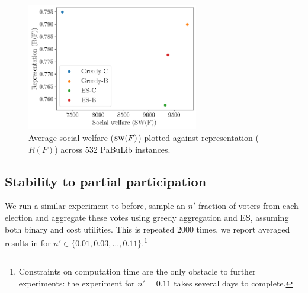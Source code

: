 \documentclass[mnsc,blindrev]{informs3_freeuse} %
\newcommand{\kibitz}[2]{\ifnum\Comments=1{\color{#1}{#2}}\fi}
\newcommand{\rf}[1]{\kibitz{blue}{[Roy says:#1]}}
\newcommand{\gb}[1]{\kibitz{red}{[GB:#1]}}
\newcommand{\sw}{\textsc{sw}}
\newcommand{\mes}{ES}
\newcommand{\pabu}{PaBuLib}
\begin{document}
\begin{figure}[!h]
\begin{center}
\includegraphics[width=7.5cm]{../experiment/avg_scores.png}
\caption{Average social  welfare ($\sw(F)$) plotted against   representation ($R(F)$) across 532 \pabu{} instances. 
}\label{fig:wel_rep_pab}
\end{center}
\vspace{-3mm}
\end{figure}

\subsection{Stability to partial participation}



We run a   similar experiment to before, sample an $n'$ fraction of voters from each election and aggregate these votes  using greedy aggregation and \mes, assuming both binary and cost utilities. This is repeated 2000 times, we report averaged results in  for $n'\in \{0.01, 0.03, \ldots, 0.11\}$.\footnote{Constraints on computation time are the only obstacle to further experiments: the experiment for $n' = 0.11$ takes several days to complete.%
}
\end{document}
